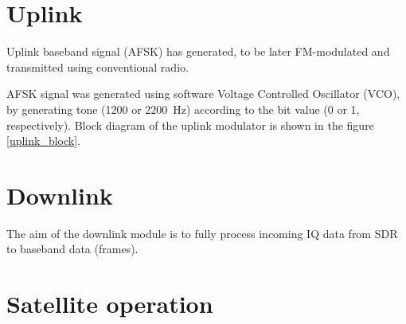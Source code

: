 

\section{Uplink}
Uplink baseband signal (AFSK) has generated, to be later FM-modulated and transmitted using conventional radio.

AFSK signal was generated using software Voltage Controlled Oscillator (VCO), by generating tone (\si{1200} or \SI{2200}{\hertz}) according to the bit value (\si{0} or \si{1}, respectively).  Block diagram of the uplink modulator is shown in the figure \ref{uplink_block}.


\section{Downlink}
The aim of the downlink module is to fully process incoming IQ data from SDR to baseband data (frames).




\section{Satellite operation}

